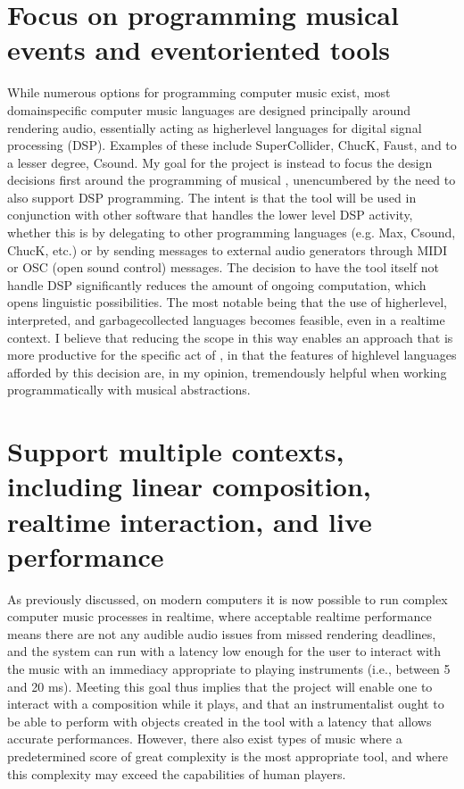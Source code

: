 \documentclass[letterpaper,10pt,english]{sphinxmanual}
\begin{document}
\section{Focus on programming musical events and event\sphinxhyphen{}oriented tools}
\label{\detokenize{goals:focus-on-programming-musical-events-and-event-oriented-tools}}
\sphinxAtStartPar
While numerous options for programming computer music exist, most domain\sphinxhyphen{}specific computer music languages are
designed principally around rendering audio, essentially acting as higher\sphinxhyphen{}level languages for digital signal processing (DSP).
Examples of these include SuperCollider, ChucK, Faust, and to a lesser degree, Csound.
My goal for the project is instead to focus the design decisions first around the programming of musical ,
unencumbered by the need to also support DSP programming.
The intent is that the tool will be used in conjunction with other software that handles the lower level DSP activity,
whether this is by delegating to other programming languages (e.g. Max, Csound, ChucK, etc.)
or by sending messages to external audio generators through MIDI or OSC (open sound control) messages.
The decision to have the tool itself not handle DSP
significantly reduces the amount of ongoing computation, which opens linguistic possibilities.
The most notable being that the use of higher\sphinxhyphen{}level, interpreted, and garbage\sphinxhyphen{}collected languages becomes feasible,
even in a realtime context.
I believe that reducing the scope in this way enables an approach that is more productive
for the specific act of , in that the features of high\sphinxhyphen{}level languages afforded by this decision
are, in my opinion, tremendously helpful when working programmatically with musical abstractions.


\section{Support multiple contexts, including linear composition, realtime interaction, and live performance}
\label{\detokenize{goals:support-multiple-contexts-including-linear-composition-realtime-interaction-and-live-performance}}
\sphinxAtStartPar
As previously discussed, on modern computers it is now possible to run complex computer music processes in realtime,
where acceptable realtime performance means there are not any audible audio issues from missed rendering deadlines, and the system can run with a
latency low enough for the user to interact with the music with an immediacy appropriate to playing instruments (i.e., between 5 and 20 ms).
Meeting this goal thus implies that the project will enable one to interact with a composition while it plays,
and that an instrumentalist ought to be able to perform with objects created in the tool with a latency that allows accurate performances.
However, there also exist types of music where a predetermined score of great complexity is the most
appropriate tool, and where this complexity may exceed the capabilities of human players.
\end{document}

